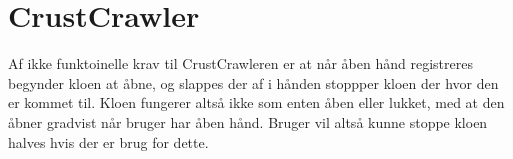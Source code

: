 \section{CrustCrawler}
Af ikke funktoinelle krav til CrustCrawleren er at når åben hånd registreres begynder kloen at åbne, og slappes der af i hånden stoppper kloen der hvor den er kommet til. Kloen fungerer altså ikke som enten åben eller lukket, med at den åbner gradvist når bruger har åben hånd. Bruger vil altså kunne stoppe kloen halves hvis der er brug for dette.